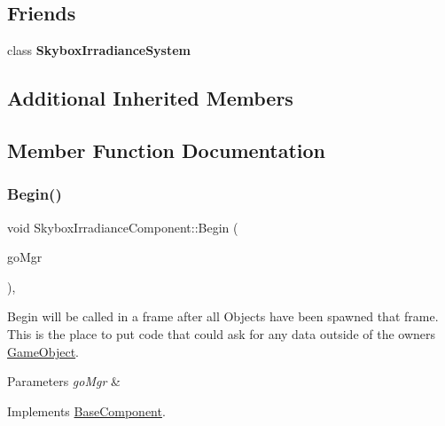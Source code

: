 \subsection*{Friends}
\begin{DoxyCompactItemize}
\item 
\mbox{\label{classSkyboxIrradianceComponent_a59dd106587626978b72dd84990bdf562}} 
class {\bfseries Skybox\+Irradiance\+System}
\end{DoxyCompactItemize}
\subsection*{Additional Inherited Members}


\subsection{Member Function Documentation}
\mbox{\label{classSkyboxIrradianceComponent_a39357a3138b9727a31df30f2b8f2a42d}} 
\subsubsection{\texorpdfstring{Begin()}{Begin()}}
{\footnotesize\ttfamily void Skybox\+Irradiance\+Component\+::\+Begin (\begin{DoxyParamCaption}\item[{\hyperlink{classGameObjectManager}{Game\+Object\+Manager} $\ast$}]{go\+Mgr }\end{DoxyParamCaption})\hspace{0.3cm}{\ttfamily [override]}, {\ttfamily [virtual]}}



Begin will be called in a frame after all Objects have been spawned that frame. This is the place to put code that could ask for any data outside of the owner\textquotesingle{}s \hyperlink{classGameObject}{Game\+Object}. 


\begin{DoxyParams}{Parameters}
{\em go\+Mgr} & \\
\hline
\end{DoxyParams}


Implements \hyperlink{classBaseComponent}{Base\+Component}.

